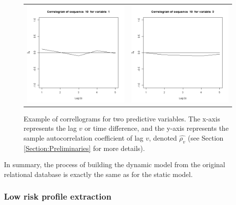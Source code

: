 \begin{figure}[h]
  \centering
    \begin{tabular}{cc}
    \includegraphics[width=70mm]{figures/CajaMarcrl1}&
     \includegraphics[width=70mm]{figures/CajaMarcrl3}\\
  \end{tabular}
    \caption{\label{fig:cajamarCorr}Example of correllograms for two predictive variables.  The x-axis represents the lag $v$ or time difference, and the y-axis represents the sample autocorrelation coefficient of lag $v$, denoted $\hat{\rho_v}$ (see Section \ref{Section:Preliminaries} for more details).}
\end{figure}

In summary, the process of building the dynamic model from the original relational database is exactly the same as for the static model.

\subsubsection{Low risk profile extraction} \label{subsubsec:profileExtraction}

